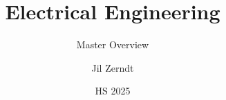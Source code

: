 \documentclass[a4paper, fontsize = 8pt, landscape]{scrartcl}
\title{Electrical Engineering}
\subtitle{Master Overview}
\author{Jil Zerndt}
\date{HS 2025}
\begin{document}
\begin{multicols}{2}
	\thispagestyle{TitlePageStyle}
	\maketitleinfo
	\sffamily
	
	\raggedcolumns
	\columnbreak 
\end{multicols}
\end{document}
